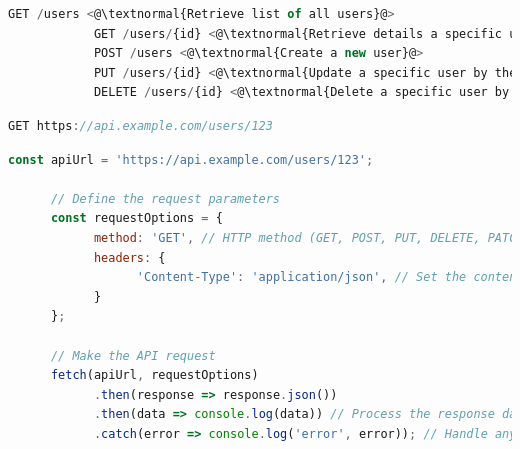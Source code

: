 \begin{lstlisting}[language=JavaScript, caption=Different HTTP methods in REST]
            GET /users <@\textnormal{Retrieve list of all users}@>
            GET /users/{id} <@\textnormal{Retrieve details a specific user by their ID}@>
            POST /users <@\textnormal{Create a new user}@>
            PUT /users/{id} <@\textnormal{Update a specific user by their ID}@>
            DELETE /users/{id} <@\textnormal{Delete a specific user by their ID}@>
\end{lstlisting}
\begin{lstlisting}[language=JavaScript, caption=REST's Example Request]
            GET https://api.example.com/users/123
\end{lstlisting}
\begin{lstlisting}[language=JavaScript, caption=Example of REST request in JavaScript]
      const apiUrl = 'https://api.example.com/users/123';

      // Define the request parameters
      const requestOptions = {
            method: 'GET', // HTTP method (GET, POST, PUT, DELETE, PATCH, etc.)
            headers: {
                  'Content-Type': 'application/json', // Set the content type of the request
            }
      };

      // Make the API request
      fetch(apiUrl, requestOptions)
            .then(response => response.json())
            .then(data => console.log(data)) // Process the response data
            .catch(error => console.log('error', error)); // Handle any errors that occurred during the request
\end{lstlisting}
